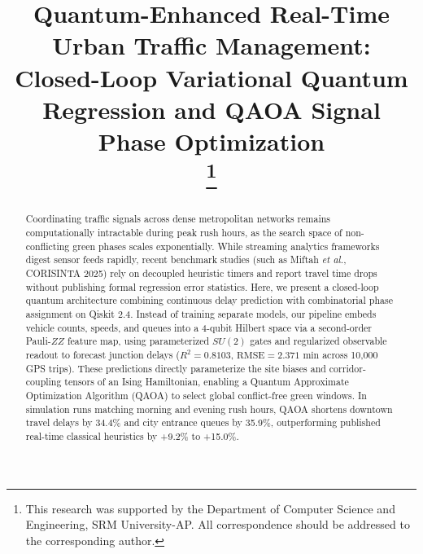 \documentclass[conference]{IEEEtran}
\begin{document}
\title{Quantum-Enhanced Real-Time Urban Traffic Management: Closed-Loop Variational Quantum Regression and QAOA Signal Phase Optimization\\
\thanks{This research was supported by the Department of Computer Science and Engineering, SRM University-AP. All correspondence should be addressed to the corresponding author.}
}

\author{
\and
{}
\and
{}
}

\maketitle

\begin{abstract}
Coordinating traffic signals across dense metropolitan networks remains computationally intractable during peak rush hours, as the search space of non-conflicting green phases scales exponentially. While streaming analytics frameworks digest sensor feeds rapidly, recent benchmark studies (such as Miftah \textit{et al.}, CORISINTA 2025) rely on decoupled heuristic timers and report travel time drops without publishing formal regression error statistics. Here, we present a closed-loop quantum architecture combining continuous delay prediction with combinatorial phase assignment on Qiskit 2.4. Instead of training separate models, our pipeline embeds vehicle counts, speeds, and queues into a 4-qubit Hilbert space via a second-order Pauli-$ZZ$ feature map, using parameterized $SU(2)$ gates and regularized observable readout to forecast junction delays ($R^2 = 0.8103$, $\text{RMSE} = 2.371\text{ min}$ across 10,000 GPS trips). These predictions directly parameterize the site biases and corridor-coupling tensors of an Ising Hamiltonian, enabling a Quantum Approximate Optimization Algorithm (QAOA) to select global conflict-free green windows. In simulation runs matching morning and evening rush hours, QAOA shortens downtown travel delays by 34.4\% and city entrance queues by 35.9\%, outperforming published real-time classical heuristics by +9.2\% to +15.0\%.
\end{abstract}
\end{document}
